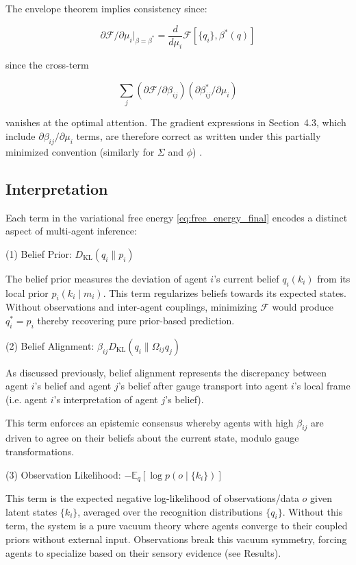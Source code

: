 \documentclass[twoside,11pt]{article}
\begin{document}
The envelope theorem implies consistency since:

$$
\partial\mathcal{F}/\partial\mu_i\big|_{\beta=\beta^*} =\frac{d}{d\mu_i}\mathcal{F}[\{q_i\}, \beta^*(q)]
$$ 

since the cross-term

$$
\sum_j(\partial\mathcal{F}/\partial\beta_{ij})(\partial\beta^*_{ij}/\partial\mu_i)
$$

vanishes at the optimal attention. The gradient expressions in Section~4.3, which include $\partial\beta_{ij}/\partial\mu_i$ terms, are therefore correct as written under this partially minimized convention (similarly for $\Sigma$ and $\phi$) .


\subsection{Interpretation}

Each term in the variational free energy \eqref{eq:free_energy_final} encodes a distinct aspect of multi-agent inference:

(1) Belief Prior: $D_{\mathrm{KL}}(q_i \| p_i)$

The belief prior measures the deviation of agent $i$'s current belief $q_i(k_i)$ from its local prior $p_i(k_i \mid m_i)$. This term regularizes beliefs towards its expected states. Without observations and inter-agent couplings, minimizing $\mathcal{F}$ would produce $q_i^* = p_i$ thereby recovering pure prior-based prediction.

(2) Belief Alignment: $\beta_{ij} D_{\mathrm{KL}}(q_i \| \Omega_{ij} q_j)$

As discussed previously, belief alignment represents the discrepancy between agent $i$'s belief and agent $j$'s belief after gauge transport into agent $i$'s local frame (i.e. agent $i$'s interpretation of agent $j$'s belief).

This term enforces an epistemic consensus whereby agents with high $\beta_{ij}$ are driven to agree on their beliefs about the current state, modulo gauge transformations. 

(3) Observation Likelihood: $-\mathbb{E}_q[\log p(o \mid \{k_i\})]$

This term is the expected negative log-likelihood of observations/data $o$ given latent states $\{k_i\}$, averaged over the recognition distributions $\{q_i\}$. Without this term, the system is a pure vacuum theory where agents converge to their coupled priors without external input. Observations break this vacuum symmetry, forcing agents to specialize based on their sensory evidence (see Results).
\end{document}
